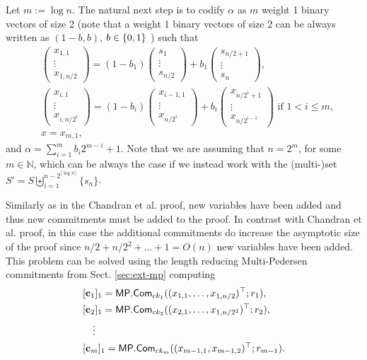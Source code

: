 Let $m:=\log n$. The natural next step is to codify $\alpha$ as $m$ weight 1 binary vectors of size 2 (note that a weight 1 binary vectors of size 2 can be always written as $(1-b,b)$, $b\in\{0,1\}$ ) such that
\begin{align}
&\begin{pmatrix}
x_{1,1}\\\vdots\\ x_{1,n/2}
\end{pmatrix}
=
(1-b_1)
\begin{pmatrix}
s_1\\\vdots\\ s_{n/2}
\end{pmatrix}
+
b_1
\begin{pmatrix}
s_{n/2+1}\\\vdots\\ s_{n}
\end{pmatrix},\label{eq-log-1}\\
&\begin{pmatrix}
x_{i,1}\\\vdots\\x_{i,n/{2^i}}
\end{pmatrix}
=
(1-b_i)
\begin{pmatrix}
x_{i-1,1}\\\vdots\\x_{n/{2^i}}
\end{pmatrix}
+
b_i
\begin{pmatrix}
x_{n/{2^i}+1}\\\vdots\\x_{n/{2^{i-1}}}
\end{pmatrix}
\text{ if } 1 <  i \leq m,\label{eq-log-2}\\
&
x= x_{m,1}\label{eq-log-3},
\end{align}
and $\alpha=\sum_{i=1}^{m}b_i2^{m-i}+1$. Note that we are assuming that $n=2^m$, for some $m\in\mathbb{N}$, which can be always the case if we instead work with the (multi-)set $S'=S\biguplus_{i=1}^{n-2^{\lceil \log n \rceil}}\{s_n\}$.

Similarly as in the Chandran et al. proof, new variables have been added and thus new commitments must be added to the proof. In contrast with Chandran et al. proof, in this case the additional commitments do increase the asymptotic size of the proof since $n/2+n/2^2+\ldots+1=O(n)$ new variables have been added. This problem can be solved using the length reducing Multi-Pedersen commitments from Sect. \ref{sec:ext-mp} computing
\begin{align*}
&[\mathbf{c}_1]_1=\mathsf{MP}.\mathsf{Com}_{ck_1}((x_{1,1},\ldots,x_{1,n/2})^\top;r_1),\\
&[\mathbf{c}_2]_1=\mathsf{MP}.\mathsf{Com}_{ck_2}((x_{2,1},\ldots,x_{1,n/2^2})^\top;r_2),\\
&\quad\vdots\\
&[\mathbf{c}_{m}]_1=\mathsf{MP}.\mathsf{Com}_{ck_{m}}((x_{m-1,1},x_{m-1,2})^\top;r_{m-1}).
\end{align*}


